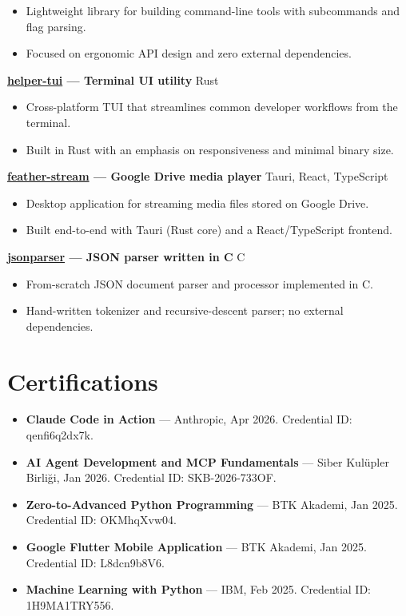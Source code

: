 \documentclass[10pt,a4paper]{extarticle}
\begin{document}
\begin{itemize}[leftmargin=*,noitemsep,topsep=0pt]
    \item Lightweight library for building command-line tools with subcommands and flag parsing.
    \item Focused on ergonomic API design and zero external dependencies.
\end{itemize}
\noindent\textbf{\href{https://github.com/yigit433/helper-tui}{helper-tui} — Terminal UI utility} \hfill Rust\\
\begin{itemize}[leftmargin=*,noitemsep,topsep=0pt]
    \item Cross-platform TUI that streamlines common developer workflows from the terminal.
    \item Built in Rust with an emphasis on responsiveness and minimal binary size.
\end{itemize}
\noindent\textbf{\href{https://github.com/yigit433/feather-stream}{feather-stream} — Google Drive media player} \hfill Tauri, React, TypeScript\\
\begin{itemize}[leftmargin=*,noitemsep,topsep=0pt]
    \item Desktop application for streaming media files stored on Google Drive.
    \item Built end-to-end with Tauri (Rust core) and a React/TypeScript frontend.
\end{itemize}
\noindent\textbf{\href{https://github.com/yigit433/jsonparser}{jsonparser} — JSON parser written in C} \hfill C\\
\begin{itemize}[leftmargin=*,noitemsep,topsep=0pt]
    \item From-scratch JSON document parser and processor implemented in C.
    \item Hand-written tokenizer and recursive-descent parser; no external dependencies.
\end{itemize}
\section{Certifications}
\begin{itemize}[leftmargin=*,noitemsep,topsep=0pt]
    \item \textbf{Claude Code in Action} --- Anthropic, Apr 2026. Credential ID: qenfi6q2dx7k.
    \item \textbf{AI Agent Development and MCP Fundamentals} --- Siber Kulüpler Birliği, Jan 2026. Credential ID: SKB-2026-733OF.
    \item \textbf{Zero-to-Advanced Python Programming} --- BTK Akademi, Jan 2025. Credential ID: OKMhqXvw04.
    \item \textbf{Google Flutter Mobile Application} --- BTK Akademi, Jan 2025. Credential ID: L8dcn9b8V6.
    \item \textbf{Machine Learning with Python} --- IBM, Feb 2025. Credential ID: 1H9MA1TRY556.
\end{itemize}
\end{document}
